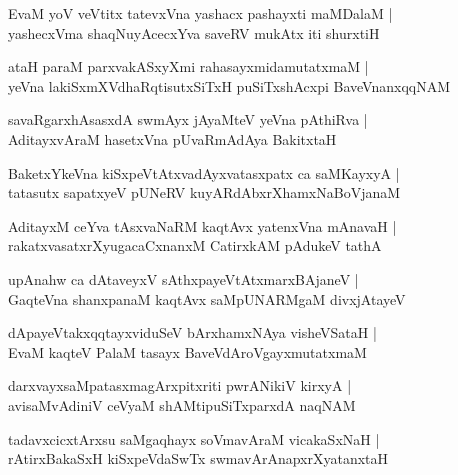 \begin{shloka}
EvaM yoV veVtitx tatevxVna yashacx pashayxti maMDalaM |\\
yashecxVma shaqNuyAcecxYva saveRV mukAtx iti shurxtiH 
\end{shloka}

\begin{shloka}
ataH paraM parxvakASxyXmi rahasayxmidamutatxmaM |\\
yeVna lakiSxmXVdhaRqtisutxSiTxH puSiTxshAcxpi BaveVnanxqqNAM
\end{shloka}

\begin{shloka}
savaRgarxhAsasxdA swmAyx jAyaMteV yeVna pAthiRva |\\
AditayxvAraM hasetxVna pUvaRmAdAya BakitxtaH 
\end{shloka}

\begin{shloka}
BaketxYkeVna kiSxpeVtAtxvadAyxvatasxpatx ca saMKayxyA |\\
tatasutx sapatxyeV pUNeRV kuyARdAbxrXhamxNaBoVjanaM 
\end{shloka}

\begin{shloka}
AditayxM ceYva tAsxvaNaRM kaqtAvx yatenxVna mAnavaH |\\
rakatxvasatxrXyugacaCxnanxM CatirxkAM pAdukeV tathA
\end{shloka}

\begin{shloka}
upAnahw ca dAtaveyxV sAthxpayeVtAtxmarxBAjaneV |\\
GaqteVna shanxpanaM kaqtAvx saMpUNARMgaM divxjAtayeV 
\end{shloka}

\begin{shloka}
dApayeVtakxqqtayxviduSeV bArxhamxNAya visheVSataH |\\
EvaM kaqteV PalaM tasayx BaveVdAroVgayxmutatxmaM 
\end{shloka}

\begin{shloka}
darxvayxsaMpatasxmagArxpitxriti pwrANikiV kirxyA |\\
avisaMvAdiniV ceVyaM shAMtipuSiTxparxdA naqNAM
\end{shloka}

\begin{shloka}
tadavxcicxtArxsu saMgaqhayx soVmavAraM vicakaSxNaH |\\
rAtirxBakaSxH kiSxpeVdaSwTx swmavArAnapxrXyatanxtaH 
\end{shloka}


